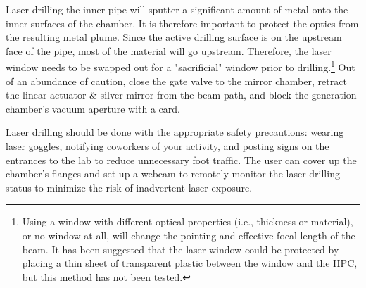 Laser drilling the inner pipe will sputter a significant amount of metal onto the inner surfaces of the chamber. It is therefore important to protect the optics from the resulting metal plume. Since the active drilling surface is on the upstream face of the pipe, most of the material will go upstream. Therefore, the laser window needs to be swapped out for a "sacrificial" window prior to drilling.\footnote{Using a window with different optical properties (i.e., thickness or material), or no window at all, will change the pointing and effective focal length of the beam. It has been suggested that the laser window could be protected by placing a thin sheet of transparent plastic between the window and the HPC, but this method has not been tested.} Out of an abundance of caution, close the gate valve to the mirror chamber, retract the linear actuator \& silver mirror from the beam path, and block the generation chamber's vacuum aperture with a card.

Laser drilling should be done with the appropriate safety precautions: wearing laser goggles, notifying coworkers of your activity, and posting signs on the entrances to the lab to reduce unnecessary foot traffic. The user can cover up the chamber's flanges and set up a webcam to remotely monitor the laser drilling status to minimize the risk of inadvertent laser exposure.

